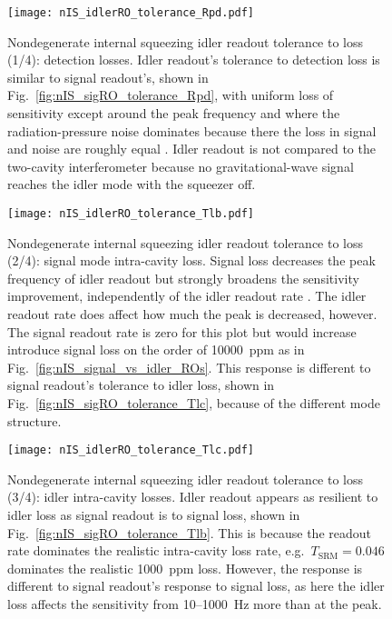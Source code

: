 \begin{figure}
    \centering
    \texttt{[image: nIS\_idlerRO\_tolerance\_Rpd.pdf]} 
    \caption{ Nondegenerate internal squeezing idler readout tolerance to loss (1/4): detection losses. Idler readout's tolerance to detection loss is similar to signal readout's, shown in Fig.~\ref{fig:nIS_sigRO_tolerance_Rpd}, with uniform loss of sensitivity except around the peak frequency and where the radiation-pressure noise dominates because there the loss in signal and noise are roughly equal . Idler readout is not compared to the two-cavity interferometer because no gravitational-wave signal reaches the idler mode with the squeezer off.}
    \label{fig:nIS_idlerRO_tolerance_Rpd}
\end{figure}
\begin{figure}
	\centering
	\texttt{[image: nIS\_idlerRO\_tolerance\_Tlb.pdf]}
	\caption{ Nondegenerate internal squeezing idler readout tolerance to loss (2/4): signal mode intra-cavity loss. Signal loss decreases the peak frequency of idler readout but strongly broadens the sensitivity improvement, independently of the idler readout rate . The idler readout rate does affect how much the peak is decreased, however. The signal readout rate is zero for this plot but would increase introduce signal loss on the order of 10000~ppm as in Fig.~\ref{fig:nIS_signal_vs_idler_ROs}. This response is different to signal readout's tolerance to idler loss, shown in Fig.~\ref{fig:nIS_sigRO_tolerance_Tlc}, because of the different mode structure.}
	\label{fig:nIS_idlerRO_tolerance_Tlb}
\end{figure}
\begin{figure}
	\centering
	\texttt{[image: nIS\_idlerRO\_tolerance\_Tlc.pdf]}
	\caption{  Nondegenerate internal squeezing idler readout tolerance to loss (3/4): idler intra-cavity losses. Idler readout appears as resilient to idler loss as signal readout is to signal loss, shown in Fig.~\ref{fig:nIS_sigRO_tolerance_Tlb}. This is because the readout rate dominates the realistic intra-cavity loss rate, e.g.\ $T_\text{SRM}=0.046$ dominates the realistic 1000~ppm loss. However, the response is different to signal readout's response to signal loss, as here the idler loss affects the sensitivity from 10--1000~Hz more than at the peak. }
	\label{fig:nIS_idlerRO_tolerance_Tlc}
\end{figure}
